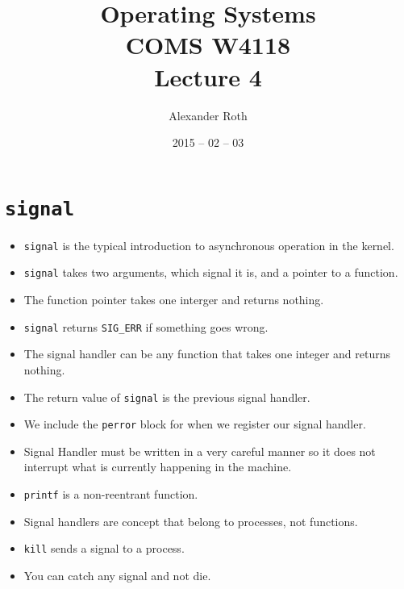 \documentclass[]{article}
\newcommand{\code}{\texttt}
\begin{document}
\newtheorem{thm}{Theorem}
\title{Operating Systems \\ COMS W4118 \\ Lecture 4}
\author{Alexander Roth}
\date{2015 -- 02 -- 03}
\maketitle

\section*{\code{signal}}
\begin{itemize}
\item \code{signal} is the typical introduction to asynchronous operation in the
kernel.
\item \code{signal} takes two arguments, which signal it is, and a pointer to a
function.
\item The function pointer takes one interger and returns nothing.
\item \code{signal} returns \code{SIG\_ERR} if something goes wrong.
\item The signal handler can be any function that takes one integer and returns
nothing.
\item The return value of \code{signal} is the previous signal handler.
\item We include the \code{perror} block for when we register our signal
handler.
\item Signal Handler must be written in a very careful manner so it does not
interrupt what is currently happening in the machine.
\item \code{printf} is a non-reentrant function.
\item Signal handlers are concept that belong to processes, not functions.
\item \code{kill} sends a signal to a process.
\item You can catch any signal and not die.
\end{itemize}
\end{document}
